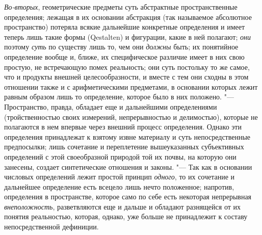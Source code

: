{{{\em Во-вторых},
геометрические предметы суть абстрактные пространственные
определения; лежащая в их основании абстракция (так называемое абсолютное
пространство) потеряла всякие дальнейшие конкретные определения и имеет
теперь лишь такие формы (Qestalten) и фигурации, какие в ней
полагают; {\em они}
поэтому {\em суть}
по существу лишь то, чем они
{\em должны} быть; их
понятийное определение вообще и, ближе, их специфическое
различие имеет в них свою простую, не встречающую помех реальность; они
суть постольку то же самое, что и продукты внешней целесообразности, и
вместе с тем они сходны в этом отношении также и с арифметическими
предметами, в основании которых лежит равным образом лишь то определение,
которое было в них положено. "--- Пространство, правда,
обладает еще и дальнейшими определениями (тройственностью своих измерений,
непрерывностью и делимостью), которые не полагаются в нем впервые через
внешний процесс определения. Однако эти определения принадлежат к взятому
извне материалу и суть непосредственные предпосылки; лишь сочетание и
переплетение вышеуказанных субъективных определений с этой своеобразной
природой той их почвы, на которую они занесены, создает синтетические
отношения и законы. "--- Так как в основании числовых
определений лежит простой принцип
{\em одного}, то их
сочетание и дальнейшее определение есть всецело лишь нечто положенное;
напротив, определения в пространстве, которое само по себе есть некоторая
непрерывная {\em внеположность},
разветвляются еще и дальше и обладают разнящейся от их
понятия реальностью, которая, однако, уже больше не принадлежит к составу
непосредственной дефиниции.

}}
